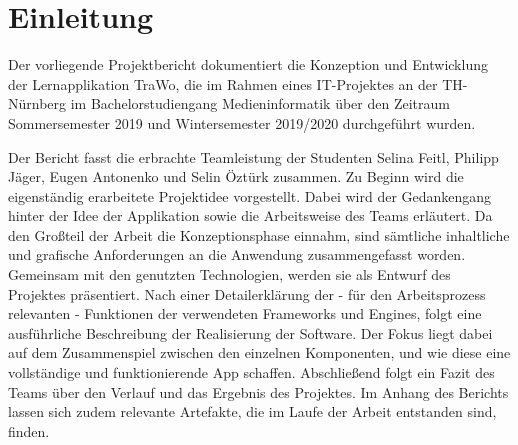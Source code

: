 \chapter{Einleitung}\label{ch:einleitung}
Der vorliegende Projektbericht dokumentiert die Konzeption und Entwicklung der Lernapplikation \glqq TraWo\grqq, die im Rahmen eines IT-Projektes an der TH-Nürnberg im Bachelorstudiengang Medieninformatik über den Zeitraum Sommersemester 2019 und Wintersemester 2019/2020 durchgeführt wurden.

Der Bericht fasst die erbrachte Teamleistung der Studenten Selina Feitl, Philipp Jäger, Eugen Antonenko und Selin Öztürk zusammen. Zu Beginn wird die eigenständig erarbeitete Projektidee vorgestellt. Dabei wird der Gedankengang hinter der Idee der Applikation sowie die Arbeitsweise des Teams erläutert. 
Da den Großteil der Arbeit die Konzeptionsphase einnahm, sind sämtliche inhaltliche und grafische Anforderungen an die Anwendung zusammengefasst worden. Gemeinsam mit den genutzten Technologien, werden sie als Entwurf des Projektes präsentiert.
Nach einer Detailerklärung der - für den Arbeitsprozess relevanten - Funktionen der  verwendeten Frameworks und Engines, folgt eine ausführliche Beschreibung der Realisierung der Software. Der Fokus liegt dabei auf dem Zusammenspiel zwischen den einzelnen Komponenten, und wie diese eine vollständige und funktionierende App schaffen.
Abschließend folgt ein Fazit des Teams über den Verlauf und das Ergebnis des Projektes. Im Anhang des Berichts lassen sich zudem relevante Artefakte, die im Laufe der Arbeit entstanden sind, finden.

